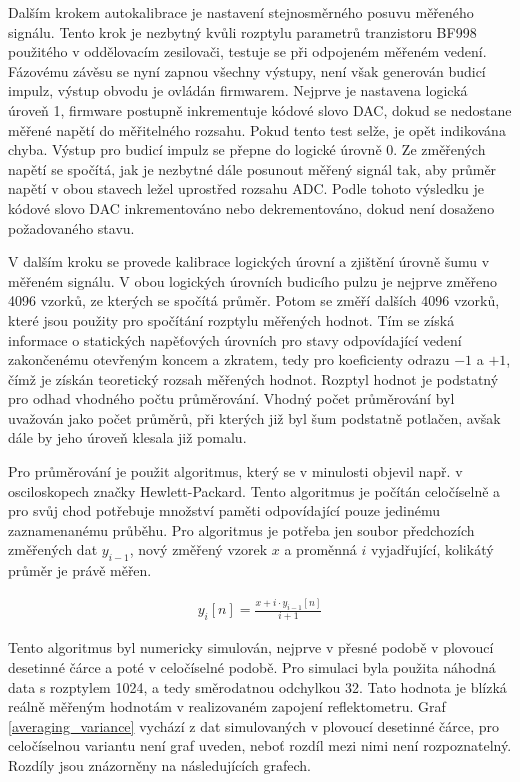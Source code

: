 Dalším krokem autokalibrace je nastavení stejnosměrného posuvu měřeného signálu. Tento krok je nezbytný kvůli rozptylu parametrů tranzistoru BF998 použitého v oddělovacím zesilovači, testuje se při odpojeném měřeném vedení. Fázovému závěsu se nyní zapnou všechny výstupy, není však generován budicí impulz, výstup obvodu je ovládán firmwarem. Nejprve je nastavena logická úroveň 1, firmware postupně inkrementuje kódové slovo \acrshort{DAC}, dokud se nedostane měřené napětí do měřitelného rozsahu. Pokud tento test selže, je opět indikována chyba. Výstup pro budicí impulz se přepne do logické úrovně 0. Ze změřených napětí se spočítá, jak je nezbytné dále posunout měřený signál tak, aby průměr napětí v obou stavech ležel uprostřed rozsahu ADC. Podle tohoto výsledku je kódové slovo DAC inkrementováno nebo dekrementováno, dokud není dosaženo požadovaného stavu.

V dalším kroku se provede kalibrace logických úrovní a zjištění úrovně šumu v měřeném signálu. V obou logických úrovních budicího pulzu je nejprve změřeno 4096 vzorků, ze kterých se spočítá průměr. Potom se změří dalších 4096 vzorků, které jsou použity pro spočítání rozptylu měřených hodnot. Tím se získá informace o statických napěťových úrovních pro stavy odpovídající vedení zakončenému otevřeným koncem a zkratem, tedy pro koeficienty odrazu $-1$ a $+1$, čímž je získán teoretický rozsah měřených hodnot. Rozptyl hodnot je podstatný pro odhad vhodného počtu průměrování. Vhodný počet průměrování byl uvažován jako počet průměrů, při kterých již byl šum podstatně potlačen, avšak dále by jeho úroveň klesala již pomalu.

Pro průměrování je použit algoritmus, který se v minulosti objevil např. v osciloskopech značky Hewlett-Packard. Tento algoritmus je počítán celočíselně a pro svůj chod potřebuje množství paměti odpovídající pouze jedinému zaznamenanému průběhu. Pro algoritmus je potřeba jen soubor předchozích změřených dat $ y_{i-1}$, nový změřený vzorek $x$ a proměnná $i$ vyjadřující, kolikátý průměr je právě měřen.

\begin{equation}
\begin{gathered}
	y_i[n]=	\frac{x+i \cdot y_{i-1}[n]}{i+1}
\end{gathered}
\end{equation}

Tento algoritmus byl numericky simulován, nejprve v přesné podobě v plovoucí desetinné čárce a poté v celočíselné podobě. Pro simulaci byla použita náhodná data s rozptylem 1024, a tedy směrodatnou odchylkou 32. Tato hodnota je blízká reálně měřeným hodnotám v realizovaném zapojení reflektometru. Graf \ref{averaging_variance} vychází z dat simulovaných v plovoucí desetinné čárce, pro celočíselnou variantu není graf uveden, neboť rozdíl mezi nimi není rozpoznatelný. Rozdíly jsou znázorněny na následujících grafech.


